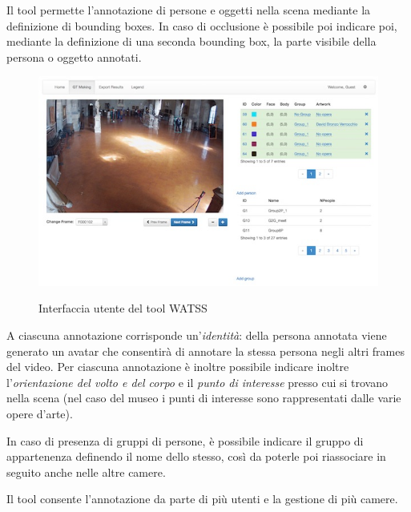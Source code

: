 Il tool permette l'annotazione di persone e oggetti nella scena mediante la definizione di bounding boxes. In caso di occlusione è possibile poi indicare poi, mediante la definizione di una seconda bounding box, la parte visibile della persona o oggetto annotati.

\begin{figure}[h]
\centering
\includegraphics[width=1\linewidth]{images/watss.jpg}
  \label{fig:watss}
  \caption{Interfaccia utente del tool WATSS}
\end{figure}

A ciascuna annotazione corrisponde un'\emph{identità}: della persona annotata viene generato un avatar che consentirà di annotare la stessa persona negli altri frames del video.
Per ciascuna annotazione è inoltre possibile indicare inoltre l'\emph{orientazione del volto e del corpo} e il \emph{punto di interesse} presso cui si trovano nella scena (nel caso del museo i punti di interesse sono rappresentati dalle varie opere d'arte).

In caso di presenza di gruppi di persone, è possibile indicare il gruppo di appartenenza definendo il nome dello stesso, così da poterle poi riassociare in seguito anche nelle altre camere.

Il tool consente l'annotazione da parte di più utenti e la gestione di più camere.
